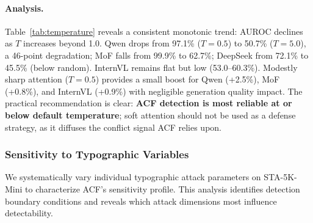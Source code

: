 \documentclass[preprint,12pt]{elsarticle}
\begin{document}
\paragraph{Analysis.} Table~\ref{tab:temperature} reveals a consistent monotonic trend: AUROC declines as $T$ increases beyond 1.0. Qwen drops from 97.1\% ($T{=}0.5$) to 50.7\% ($T{=}5.0$), a 46-point degradation; MoF falls from 99.9\% to 62.7\%; DeepSeek from 72.1\% to 45.5\% (below random). InternVL remains flat but low (53.0--60.3\%). Modestly sharp attention ($T{=}0.5$) provides a small boost for Qwen (+2.5\%), MoF (+0.8\%), and InternVL (+0.9\%) with negligible generation quality impact. The practical recommendation is clear: \textbf{ACF detection is most reliable at or below default temperature}; soft attention should not be used as a defense strategy, as it diffuses the conflict signal ACF relies upon.

\subsubsection{Sensitivity to Typographic Variables}
\label{sec:ablation_variables}

We systematically vary individual typographic attack parameters on STA-5K-Mini to characterize ACF's sensitivity profile. This analysis identifies detection boundary conditions and reveals which attack dimensions most influence detectability.
\end{document}
